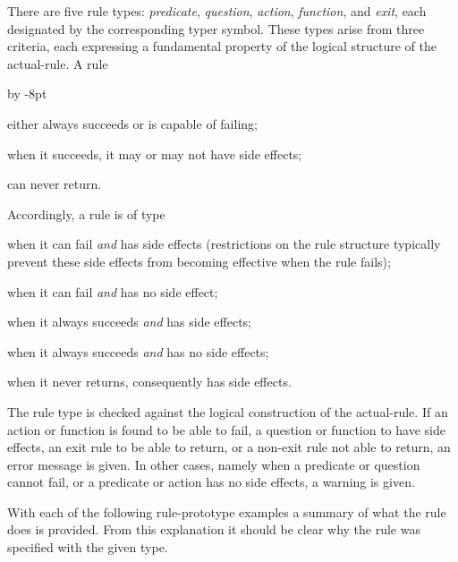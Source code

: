 \documentclass{article}
\newcommand\g[1]{{\color{blue!50!black}\sf #1}}
\renewenvironment{itemize}{\begin{list}{}{%
\advance\leftmargin by -8pt%
\setlength\itemsep{0ex plus 0.2ex}%
\setlength\partopsep{3pt}%
\setlength\topsep{2pt plus 2pt}%
\setlength\parsep{0pt plus 2pt}%
}}{\end{list}}
\renewcommand\/{\kern 0.066em}
\def\GREEN{\color{green!30!black}\tt}
\gdef\pp#1{\relax\begingroup
\catcode`\$=12\catcode`\~=12\catcode`\^=12%
\catcode`\|\active\let|\endgroup
\catcode`\ \active\def {\space}%
\catcode`\'\active\def'##1'{\char39\relax{\bt##1}\char39\relax}%
\catcode`\<\active\def<{\char60\relax}%
\catcode`\>\active\def>{\char62\relax}%
\catcode`\#=12\catcode`\^=12%
\GREEN%
}%
\begin{document}
There are five rule types: \emph{predicate}, \emph{question}, \emph{action},
\emph{function}, and \emph{exit}, each designated by the corresponding
\g{typer} symbol. These types arise from three criteria, each expressing a
fundamental property of the logical structure of the \g{actual-rule}. A rule
\begin{itemize}
\item[a)] either always succeeds or is capable of failing;
\item[b)] when it succeeds, it may or may not have side effects;
\item[c)] can never return.
\end{itemize}
Accordingly, a rule is of type
\begin{list}{}{\setlength\topsep{2pt}%
\setlength\partopsep{3pt}%
\setlength{}%
\setlength{}%
\setlength{}%
\setlength\leftmargin{\parindent}}
\item[\emph{predicate}, ]
when it can fail \emph{and} has side effects (restrictions on the rule
structure typically prevent these side effects from becoming effective
when the rule fails);
\item[\emph{question}, ]
when it can fail \emph{and} has no side effect;
\item[\emph{action}, ]
when it always succeeds \emph{and} has side effects;
\item[\emph{function}, ]
when it always succeeds \emph{and} has no side effects;
\item[\emph{exit}, ]
when it never returns, consequently has side effects.
\end{list}
The rule type is checked against the logical construction of the
\g{actual-rule}. If an action or function is found to be able to fail, a
question or function to have side effects, an exit rule to be able to
return, or a non-exit rule not able to return, an error message is given.
In other cases, namely when a predicate or question cannot fail, or a
predicate or action has no side effects, a warning is given.

With each of the following \g{rule-prototype} examples a summary of what the
rule does is provided. From this explanation it should be clear why the
rule was specified with the given type.

\smallskip\noindent
{}
\end{document}
